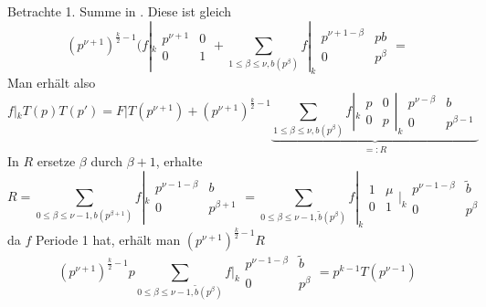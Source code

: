 \begin{bewe}
	Betrachte 1. Summe in \myref{(*)}. Diese ist gleich
	\[
		(p^{\nu + 1})^{\frac{k}{2}-1} (f|_k\begin{smallmatrix} p^{\nu+1} & 0 \\ 0 & 1 \end{smallmatrix} + \sum_{1 \leq \beta \leq \nu, b(p^\beta)} f|_k \begin{smallmatrix} p^{\nu+1-\beta} & pb \\ 0 & p^\beta \end{smallmatrix} =
	\]
	Man erhält also
	\[
		f|_k T(p)T(p')
		= F|T(p^{\nu+1}) + (p^{\nu+1})^{\frac{k}{2}-1} \underbrace{\sum_{1 \leq \beta \leq \nu, b(p^\beta)} f|_k \begin{smallmatrix} p & 0 \\ 0 & p \end{smallmatrix} |_k \begin{smallmatrix} p^{\nu-\beta} & b \\ 0 & p^{\beta-1} \end{smallmatrix}
		}_{=: R}
	\]
	In $R$ ersetze $\beta$ durch $\beta + 1$, erhalte
	\[
		R = \sum_{0 \leq \beta \leq \nu-1, b(p^{\beta+1})} f|_k \begin{smallmatrix} p^{\nu-1-\beta} & b \\ 0 & p^{\beta+1} \end{smallmatrix}
		= \sum_{ 0 \leq \beta \leq \nu-1, \tilde b(p^\beta)} f|_k \begin{smallmatrix} 1 & \mu \\ 0 & 1 \end{smallmatrix}|_k \begin{smallmatrix} p^{\nu-1-\beta} & \tilde b \\ 0 & p^\beta \end{smallmatrix}
	\]
	da $f$ Periode 1 hat, erhält man $(p^{\nu+1})^{\frac{k}{2}-1}R$
	\[
	 	(p^{\nu+1})^{\frac{k}{2}-1} p \sum_{0 \leq \beta \leq \nu-1, \tilde b(p^\beta)} f|_k \begin{smallmatrix} p^{\nu-1-\beta} & \tilde b \\ 0 & p^\beta \end{smallmatrix}
	 	= p^{k-1} T(p^{\nu-1})
	\]
\end{bewe}
